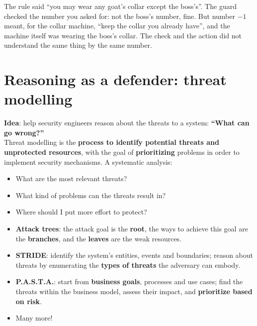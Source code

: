 \begin{goatbox}
The rule said ``you may wear any goat's collar except the boss's''. The guard checked the number
you asked for: not the boss's number, fine. But number $-1$ meant, for the collar machine, ``keep
the collar you already have'', and the machine itself was wearing the boss's collar. The check and
the action did not understand the same thing by the same number.
\end{goatbox}

\section{Reasoning as a defender: threat modelling}

\begin{defnbox}[title=Threat modelling]
\textbf{Idea}: help security engineers reason about the threats to a system: \textbf{``What can go
wrong?''} \\
Threat modelling is the \textbf{process to identify potential threats and unprotected resources},
with the goal of \textbf{prioritizing} problems in order to implement security mechanisms. A
systematic analysis:
\begin{itemize}
  \item What are the most relevant threats?
  \item What kind of problems can the threats result in?
  \item Where should I put more effort to protect?
\end{itemize}
\end{defnbox}

\begin{defnbox}[title=Threat modelling methodologies]
\begin{itemize}
  \item \textbf{Attack trees}: the attack goal is the \textbf{root}, the ways to achieve this goal
        are the \textbf{branches}, and the \textbf{leaves} are the weak resources.
  \item \textbf{STRIDE}: identify the system's entities, events and boundaries; reason about
        threats by enumerating the \textbf{types of threats} the adversary can embody.
  \item \textbf{P.A.S.T.A.}: start from \textbf{business goals}, processes and use cases; find the
        threats within the business model, assess their impact, and \textbf{prioritize based on
        risk}.
  \item Many more!
\end{itemize}
\end{defnbox}

